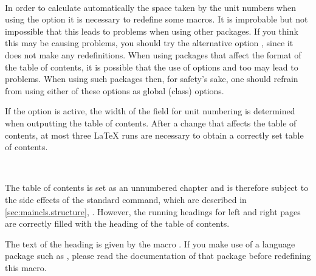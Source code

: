 
\begin{Declaration}
  \\
\end{Declaration}%
%
\begin{Explain}
  In order to calculate automatically the space taken by the unit
  numbers when using the option  it is necessary to
  redefine some macros. It is improbable but not impossible that this
  leads to problems when using other packages. If you think this may
  be causing problems, you should try the alternative option
  , since it does not make any redefinitions. When
  using packages that affect the format of the table of contents, it
  is possible that the use of options  and
   too may lead to problems. When using such
  packages then, for safety's sake, one should refrain from using
  either of these options as global (class) options.

  If the  option is active, the width of the field for
  unit numbering is determined when outputting the table of contents.
  After a change that affects the table of contents, at most three
  {\LaTeX} runs are necessary to obtain a correctly set table of
  contents.
\end{Explain}
%

\begin{Declaration}
  \\
\end{Declaration}%
%
%
\begin{Explain}
  The table of contents is set as an unnumbered chapter and is therefore
  subject to the side effects of the standard  command,
  which are described in \autoref{sec:maincls.structure},
  .  However, the running
  headings for left and right pages are correctly filled
  with the heading of the table of contents. 

  The text of the heading is given by the macro
  . If you make use of a language package such as
  , please read the documentation of that package
  before redefining this macro.
\end{Explain}%
%
%

